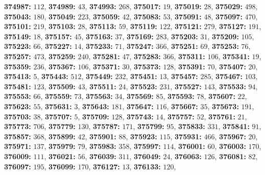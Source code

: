 \textsf{\bfseries 374987:} $112$, \textsf{\bfseries 374989:} $43$, \textsf{\bfseries 374993:} $268$, \textsf{\bfseries 375017:} $19$, \textsf{\bfseries 375019:} $28$, \textsf{\bfseries 375029:} $498$, \textsf{\bfseries 375043:} $180$, \textsf{\bfseries 375049:} $223$, \textsf{\bfseries 375059:} $42$, \textsf{\bfseries 375083:} $53$, \textsf{\bfseries 375091:} $48$, \textsf{\bfseries 375097:} $470$, \textsf{\bfseries 375101:} $219$, \textsf{\bfseries 375103:} $28$, \textsf{\bfseries 375113:} $59$, \textsf{\bfseries 375119:} $122$, \textsf{\bfseries 375121:} $279$, \textsf{\bfseries 375127:} $191$, \textsf{\bfseries 375149:} $18$, \textsf{\bfseries 375157:} $45$, \textsf{\bfseries 375163:} $37$, \textsf{\bfseries 375169:} $283$, \textsf{\bfseries 375203:} $31$, \textsf{\bfseries 375209:} $105$, \textsf{\bfseries 375223:} $66$, \textsf{\bfseries 375227:} $14$, \textsf{\bfseries 375233:} $71$, \textsf{\bfseries 375247:} $366$, \textsf{\bfseries 375251:} $69$, \textsf{\bfseries 375253:} $76$, \textsf{\bfseries 375257:} $473$, \textsf{\bfseries 375259:} $240$, \textsf{\bfseries 375281:} $47$, \textsf{\bfseries 375283:} $366$, \textsf{\bfseries 375311:} $106$, \textsf{\bfseries 375341:} $19$, \textsf{\bfseries 375359:} $236$, \textsf{\bfseries 375367:} $106$, \textsf{\bfseries 375371:} $30$, \textsf{\bfseries 375373:} $128$, \textsf{\bfseries 375391:} $70$, \textsf{\bfseries 375407:} $20$, \textsf{\bfseries 375413:} $5$, \textsf{\bfseries 375443:} $512$, \textsf{\bfseries 375449:} $232$, \textsf{\bfseries 375451:} $13$, \textsf{\bfseries 375457:} $285$, \textsf{\bfseries 375467:} $103$, \textsf{\bfseries 375481:} $123$, \textsf{\bfseries 375509:} $43$, \textsf{\bfseries 375511:} $24$, \textsf{\bfseries 375523:} $231$, \textsf{\bfseries 375527:} $143$, \textsf{\bfseries 375533:} $94$, \textsf{\bfseries 375553:} $66$, \textsf{\bfseries 375559:} $73$, \textsf{\bfseries 375563:} $34$, \textsf{\bfseries 375569:} $85$, \textsf{\bfseries 375593:} $78$, \textsf{\bfseries 375607:} $22$, \textsf{\bfseries 375623:} $55$, \textsf{\bfseries 375631:} $3$, \textsf{\bfseries 375643:} $181$, \textsf{\bfseries 375647:} $116$, \textsf{\bfseries 375667:} $35$, \textsf{\bfseries 375673:} $191$, \textsf{\bfseries 375703:} $38$, \textsf{\bfseries 375707:} $5$, \textsf{\bfseries 375709:} $128$, \textsf{\bfseries 375743:} $14$, \textsf{\bfseries 375757:} $52$, \textsf{\bfseries 375761:} $21$, \textsf{\bfseries 375773:} $706$, \textsf{\bfseries 375779:} $130$, \textsf{\bfseries 375787:} $171$, \textsf{\bfseries 375799:} $95$, \textsf{\bfseries 375833:} $331$, \textsf{\bfseries 375841:} $91$, \textsf{\bfseries 375857:} $368$, \textsf{\bfseries 375899:} $42$, \textsf{\bfseries 375901:} $88$, \textsf{\bfseries 375923:} $115$, \textsf{\bfseries 375931:} $466$, \textsf{\bfseries 375967:} $20$, \textsf{\bfseries 375971:} $137$, \textsf{\bfseries 375979:} $79$, \textsf{\bfseries 375983:} $358$, \textsf{\bfseries 375997:} $114$, \textsf{\bfseries 376001:} $60$, \textsf{\bfseries 376003:} $170$, \textsf{\bfseries 376009:} $111$, \textsf{\bfseries 376021:} $56$, \textsf{\bfseries 376039:} $311$, \textsf{\bfseries 376049:} $24$, \textsf{\bfseries 376063:} $126$, \textsf{\bfseries 376081:} $82$, \textsf{\bfseries 376097:} $195$, \textsf{\bfseries 376099:} $170$, \textsf{\bfseries 376127:} $13$, \textsf{\bfseries 376133:} $120$, 
